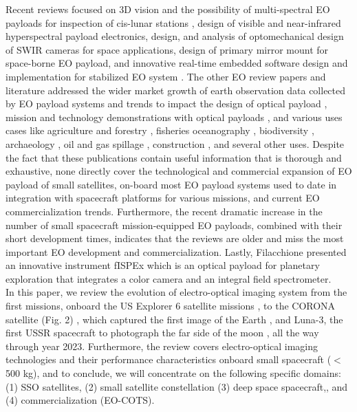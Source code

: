 \documentclass[final,5p,times,twocolumn]{elsarticle}
\begin{document}
Recent reviews focused on 3D vision and the possibility of multi-spectral EO payloads for inspection of cis-lunar stations \citep{corpino2020inspection}, design of visible and near-infrared hyperspectral payload electronics, design, and analysis of optomechanical design of SWIR cameras for space applications, design of primary mirror mount for space-borne EO payload, and innovative real-time embedded software design and implementation for stabilized EO system \citep{sastry2020advances}. The other EO review papers and literature addressed the wider market growth of earth observation data collected by EO payload systems and trends to impact the design of optical payload \citep{cronje2023}, mission and technology demonstrations with optical payloads \citep{cho2019high, thatavarthi2020payload, willoughby1996hyperspectral, mughal2021aalto, swenson2015electro, prentice2021design}, and various uses cases like agriculture and forestry  \citep{boyd2005satellite, fahey2020active}, fisheries oceanography \cite{santos2000fisheries}, biodiversity \cite{turner2003remote}, archaeology \cite{giardino2011history}, oil and gas spillage \citep{fingas1997review}, construction \citep{teizer20083d}, and several other uses. Despite the fact that these publications contain useful information that is thorough and exhaustive, none directly cover the technological and commercial expansion of EO payload of small satellites, on-board most EO payload systems used to date in integration with spacecraft platforms for various missions, and current EO commercialization trends. Furthermore, the recent dramatic increase in the number of small spacecraft mission-equipped EO payloads, combined with their short development times, indicates that the reviews are older and miss the most important EO development and commercialization. Lastly,  Filacchione \citep{filacchione2022integral} presented an innovative instrument fISPEx which is an optical payload for planetary exploration that integrates a color camera and an integral field spectrometer.\\
In this paper, we review the evolution of electro-optical imaging system from the first missions, onboard the US Explorer 6 satellite missions \citep{christopherson20192019, judge1962observations}, to the CORONA satellite (Fig. 2) \citep{ruffner1995corona, altmaier2002digital, day1999eye, ur2003corona}, which captured the first image of the Earth \citep{house1986history}, and Luna-3, the first USSR spacecraft to photograph the far side of the moon \citep{siddiqi2018beyond}, all the way through year 2023. Furthermore, the review covers electro-optical imaging technologies and their performance characteristics onboard small spacecraft ($<$ 500 kg), and to conclude, we will concentrate on the following specific domains: (1) SSO satellites, (2) small satellite constellation (3) deep space spacecraft,, and (4) commercialization (EO-COTS).
\end{document}
